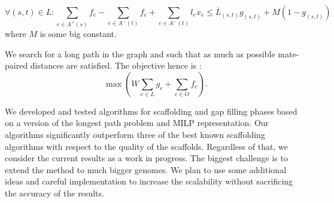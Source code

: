 \documentclass{endmH}
\newcommand{\forLaterVersions}[1]{}
\begin{document}
 \begin{equation}\label{upbound}
  \forall (s,t) \in L: 
 \sum_{e\in A^{+}(s)} f_e - \sum_{e\in A^{-}(t)} f_e +  \sum_{e\in A^{-}(t)} l_e x_e \leq   \overline{L}_{(s,t)} g_{(s,t)} + M (1-g_{(s,t)})
       \end{equation}
%       
where $M$ is some big constant.  
         
We search for a long path in the graph and such that as much as possible  mate-paired distances  are satisfied. The objective hence is : 
%
 \begin{equation}\label{all_coeff}
  \max \left(  W  \sum_{e\in L} g_e  +  \sum_{e\in O}  f_e   \right).
\end{equation}

\forLaterVersions{\smallskip\textbf{Remark:} Note that omitting constraints  (\ref{one_paths}) %
from the above model generates a set of paths that cover  "optimally" the contig graph, rather than a single path.  We have tested this variant of the model, but the obtained solutions were too much fragmented and of worse  quality compared to the single-path model.}

%

 
 We developed and tested  algorithms for scaffolding  and gap filling phases based on a version of the longest path problem and MILP representation. Our algorithms significantly outperform three of the best known scaffolding algorithms with respect to the quality of the scaffolds. Regardless of that, we consider the current results as a work in progress. The biggest challenge is to extend the method to much bigger genomes. We plan to use some additional ideas and careful implementation to increase the scalability \forLaterVersions{of the methods} without sacrificing the accuracy of the results.            


 


\end{document}
